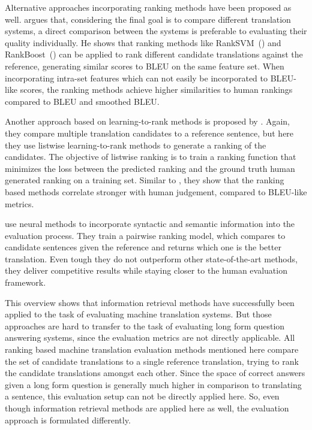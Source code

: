 Alternative approaches incorporating ranking methods have been proposed as well.
\cite{duh:2008:Ranking} argues that, considering the final goal is to compare different translation systems, a direct comparison between the systems is preferable to evaluating their quality individually.
He shows that ranking methods like RankSVM~(\cite{joachims:2002:Optimizing}) and RankBoost~(\cite{freund:2003:An}) can be applied to rank different candidate translations against the reference, generating similar scores to BLEU on the same feature set.
When incorporating intra-set features which can not easily be incorporated to BLEU-like scores, the ranking methods achieve higher similarities to human rankings compared to BLEU and smoothed BLEU.

Another approach based on learning-to-rank methods is proposed by \cite{li:2013:Listwise}.
Again, they compare multiple translation candidates to a reference sentence, but here they use listwise learning-to-rank methods to generate a ranking of the candidates.
The objective of listwise ranking is to train a ranking function that minimizes the loss between the predicted ranking and the ground truth human generated ranking on a training set.
Similar to \cite{duh:2008:Ranking}, they show that the ranking based methods correlate stronger with human judgement, compared to BLEU-like metrics.

\cite{guzman:2019:Pairwise} use neural methods to incorporate syntactic and semantic information into the evaluation process.
They train a pairwise ranking model, which compares to candidate sentences given the reference and returns which one is the better translation.
Even tough they do not outperform other state-of-the-art methods, they deliver competitive results while staying closer to the human evaluation framework.


This overview shows that information retrieval methods have successfully been applied to the task of evaluating machine translation systems.
But those approaches are hard to transfer to the task of evaluating long form question answering systems, since the evaluation metrics are not directly applicable.
All ranking based machine translation evaluation methods mentioned here compare the set of candidate translations to a single reference translation, trying to rank the candidate translations amongst each other.
Since the space of correct answers given a long form question is generally much higher in comparison to translating a sentence, this evaluation setup can not be directly applied here.
So, even though information retrieval methods are applied here as well, the evaluation approach is formulated differently.

